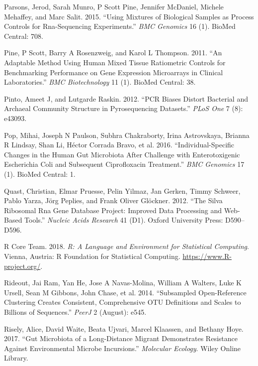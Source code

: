 \documentclass[smallextended]{svjour3}       %
\begin{document}
\leavevmode\hypertarget{ref-parsons2015using}{}%
Parsons, Jerod, Sarah Munro, P Scott Pine, Jennifer McDaniel, Michele
Mehaffey, and Marc Salit. 2015. ``Using Mixtures of Biological Samples
as Process Controls for Rna-Sequencing Experiments.'' \emph{BMC
Genomics} 16 (1). BioMed Central: 708.

\leavevmode\hypertarget{ref-pine2011adaptable}{}%
Pine, P Scott, Barry A Rosenzweig, and Karol L Thompson. 2011. ``An
Adaptable Method Using Human Mixed Tissue Ratiometric Controls for
Benchmarking Performance on Gene Expression Microarrays in Clinical
Laboratories.'' \emph{BMC Biotechnology} 11 (1). BioMed Central: 38.

\leavevmode\hypertarget{ref-Pinto2012}{}%
Pinto, Ameet J, and Lutgarde Raskin. 2012. ``PCR Biases Distort
Bacterial and Archaeal Community Structure in Pyrosequencing Datasets.''
\emph{PLoS One} 7 (8): e43093.

\leavevmode\hypertarget{ref-pop2016individual}{}%
Pop, Mihai, Joseph N Paulson, Subhra Chakraborty, Irina Astrovskaya,
Brianna R Lindsay, Shan Li, Héctor Corrada Bravo, et al. 2016.
``Individual-Specific Changes in the Human Gut Microbiota After
Challenge with Enterotoxigenic Escherichia Coli and Subsequent
Ciprofloxacin Treatment.'' \emph{BMC Genomics} 17 (1). BioMed Central:
1.

\leavevmode\hypertarget{ref-quast2012silva}{}%
Quast, Christian, Elmar Pruesse, Pelin Yilmaz, Jan Gerken, Timmy
Schweer, Pablo Yarza, Jörg Peplies, and Frank Oliver Glöckner. 2012.
``The Silva Ribosomal Rna Gene Database Project: Improved Data
Processing and Web-Based Tools.'' \emph{Nucleic Acids Research} 41 (D1).
Oxford University Press: D590--D596.

\leavevmode\hypertarget{ref-R}{}%
R Core Team. 2018. \emph{R: A Language and Environment for Statistical
Computing}. Vienna, Austria: R Foundation for Statistical Computing.
\url{https://www.R-project.org/}.

\leavevmode\hypertarget{ref-Rideout2014}{}%
Rideout, Jai Ram, Yan He, Jose A Navas-Molina, William A Walters, Luke K
Ursell, Sean M Gibbons, John Chase, et al. 2014. ``Subsampled
Open-Reference Clustering Creates Consistent, Comprehensive OTU
Definitions and Scales to Billions of Sequences.'' \emph{PeerJ} 2
(August): e545.

\leavevmode\hypertarget{ref-risely2017gut}{}%
Risely, Alice, David Waite, Beata Ujvari, Marcel Klaassen, and Bethany
Hoye. 2017. ``Gut Microbiota of a Long-Distance Migrant Demonstrates
Resistance Against Environmental Microbe Incursions.'' \emph{Molecular
Ecology}. Wiley Online Library.
\end{document}
